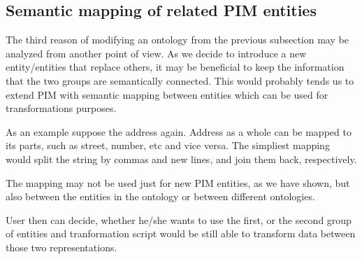 \newpage
\subsection{Semantic mapping of related PIM entities}

The third reason of modifying an ontology from the previous subsection may be analyzed from another point of view. As we decide to introduce a new entity/entities that replace others, it may be beneficial to keep the information that the two groups are semantically connected. This would probably tends us to extend PIM with semantic mapping between entities which can be used for transformations purposes.

As an example suppose the address again. Address as a whole can be mapped to its parts, such as street, number, etc and vice versa. The simpliest mapping would split the string by commas and new lines, and join them back, respectively.

The mapping may not be used just for new PIM entities, as we have shown, but also between the entities in the ontology or between different ontologies.

User then can decide, whether he/she wants to use the first, or the second group of entities and tranformation script would be still able to transform data between those two representations.


